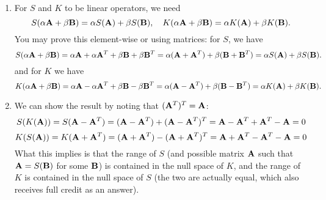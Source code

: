 {\begin{solution}
\begin{enumerate}
\item For $S$ and $K$ to be linear operators, we need
\[
S(\alpha {\bf A} + \beta{\bf B}) = \alpha S({\bf A}) + \beta S({\bf B}), \quad 
K(\alpha {\bf A} + \beta{\bf B}) = \alpha K({\bf A}) + \beta K({\bf B}).
\]
You may prove this element-wise or using matrices: for $S$, we have
\[
S(\alpha {\bf A} + \beta{\bf B}) = \alpha {\bf A} + \alpha {\bf A}^T + \beta {\bf B} + \beta {\bf B}^T = \alpha ({\bf A} + {\bf A}^T) + \beta ({\bf B} + {\bf B}^T )=\alpha S({\bf A}) + \beta S({\bf B}).
\]
and for $K$ we have
\[
K(\alpha {\bf A} + \beta{\bf B}) = \alpha {\bf A} - \alpha {\bf A}^T + \beta {\bf B} - \beta {\bf B}^T = \alpha ({\bf A} - {\bf A}^T) + \beta ({\bf B} - {\bf B}^T )=\alpha K({\bf A}) + \beta K({\bf B}).
\]
\item We can show the result by noting that $({\bf A}^T)^T = {\bf A}$:
\[
S(K({\bf A})) = S({\bf A} - {\bf A}^T) = ({\bf A} - {\bf A}^T) + ({\bf A} - {\bf A}^T)^T = {\bf A} - {\bf A}^T + {\bf A}^T - {\bf A} = 0
\]
\[
K(S({\bf A})) = K({\bf A} + {\bf A}^T) = ({\bf A} + {\bf A}^T) - ({\bf A} + {\bf A}^T)^T = {\bf A} + {\bf A}^T - {\bf A}^T - {\bf A} = 0
\]
What this implies is that the range of $S$ (and possible matrix ${\bf A}$ such that ${\bf A} = S({\bf B})$ for some ${\bf B}$) is contained in the null space of $K$, and the range of $K$ is contained in the null space of $S$ (the two are actually equal, which also receives full credit as an answer).  
\end{enumerate}
\end{solution}
}{}
